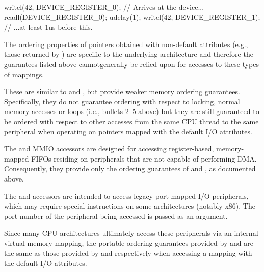 \begin{description}
\begin{enumerate}
\begin{VerbatimU}[tabsize=1]
		writel(42, DEVICE_REGISTER_0); // Arrives at the device...
		readl(DEVICE_REGISTER_0);
		udelay(1);
		writel(42, DEVICE_REGISTER_1); // ...at least 1us before this.
\end{VerbatimU}
	\end{enumerate}

	The ordering properties of  pointers obtained with
	non-default attributes (e.g., those returned by )
	are specific to the underlying architecture and therefore the
	guarantees listed above cannotgenerally be relied upon for accesses
	to these types of mappings.

 \item[\tco{readX_relaxed()}, \tco{writeX_relaxed()}:]

	These are similar to  and , but provide
	weaker memory ordering guarantees.
	Specifically, they do not guarantee ordering with respect to locking,
	normal memory accesses or  loops (i.e.,
	bullets 2--5 above) but they are still guaranteed to be ordered with
	respect to other accesses from the same CPU thread to the same
	peripheral when operating on  pointers mapped with the
        default I/O attributes.

 \item[\tco{readsX()}, \tco{writesX()}:]

	The  and  MMIO accessors are designed for
	accessing register-based, memory-mapped FIFOs residing on peripherals
	that are not capable of performing DMA\@.
	Consequently, they provide only the ordering guarantees of
	 and , as documented above.

 \item[\tco{inX()}, \tco{outX()}:]

	The  and  accessors are intended to access legacy
	port-mapped I/O peripherals, which may require special instructions
	on some architectures (notably x86).
	The port number of the peripheral being accessed is passed as an
	argument.

	Since many CPU architectures ultimately access these peripherals via an
	internal virtual memory mapping, the portable ordering guarantees
	provided by  and  are the same as those provided
	by  and  respectively when accessing a
	mapping with the default I/O attributes.


\end{description}
